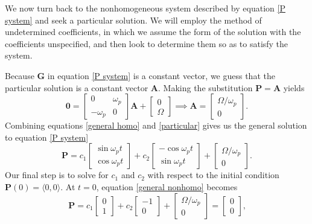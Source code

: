 \documentclass{article}
\begin{document}
We now turn back to the nonhomogeneous system described by equation \ref{P system} and seek a particular solution. We will employ the method of undetermined coefficients, in which we assume the form of the solution with the coefficients unspecified, and then look to determine them so as to satisfy the system. 

Because $\mathbf{G}$ in equation \ref{P system} is a constant vector, we guess that the particular solution is a constant vector $\mathbf{A}$. Making the substitution $\mathbf{P} = \mathbf{A}$ yields
\begin{equation}\label{particular}
    \mathbf{0} =
    \begin{bmatrix}
        0 & \omega_p \\
        -\omega_p & 0
    \end{bmatrix}\mathbf{A} +
    \begin{bmatrix}
        0 \\ \Omega
    \end{bmatrix} \implies
    \mathbf{A} =
    \begin{bmatrix}
        \Omega / \omega_p \\ 0
    \end{bmatrix}\text{.}
\end{equation}
Combining equations \ref{general homo} and \ref{particular} gives us the general solution to equation \ref{P system}
\begin{equation}\label{general nonhomo}
    \mathbf{P} = c_1
    \begin{bmatrix}
        \sin{\omega_p t} \\ \cos{\omega_p t}
    \end{bmatrix} + c_2
    \begin{bmatrix}
        -\cos{\omega_p t} \\ \sin{\omega_p t}
    \end{bmatrix} +
    \begin{bmatrix}
        \Omega / \omega_p \\ 0
    \end{bmatrix}.
\end{equation}
Our final step is to solve for $c_1$ and $c_2$ with respect to the initial condition $\mathbf{P}(0) = \langle 0, 0 \rangle$. At $t=0$, equation \ref{general nonhomo} becomes
\begin{equation}
    \mathbf{P} = c_1
    \begin{bmatrix}
        0 \\ 1
    \end{bmatrix} + c_2
    \begin{bmatrix}
        -1 \\ 0
    \end{bmatrix} +
    \begin{bmatrix}
        \Omega / \omega_p \\ 0
    \end{bmatrix} =
    \begin{bmatrix}
        0 \\ 0
    \end{bmatrix}\text{,}
\end{equation}
\end{document}
